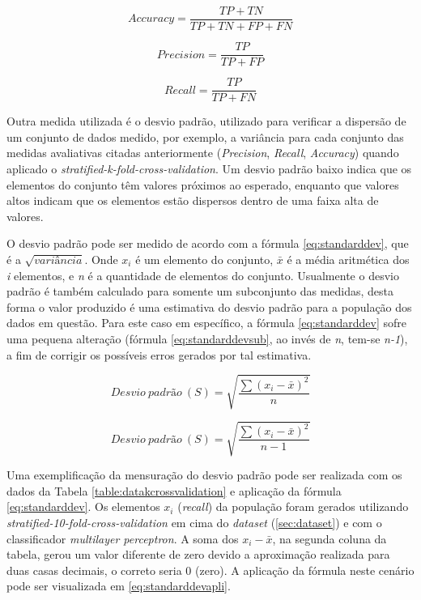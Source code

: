 \begin{equation} 
  Accuracy = \frac{TP+TN}{TP+TN+FP+FN} 
  \label{eq:accuracy}
\end{equation}

\begin{equation} 
  Precision = \frac{TP}{TP+FP}
  \label{eq:precision}
\end{equation}

\begin{equation} 
  Recall = \frac{TP}{TP+FN} 
  \label{eq:recall}
\end{equation}

Outra medida utilizada é o desvio padrão, utilizado para verificar a dispersão de um conjunto de dados medido, por exemplo, a variância para cada conjunto das medidas avaliativas citadas anteriormente (\textit{Precision}, \textit{Recall}, \textit{Accuracy}) quando aplicado o \textit{stratified-k-fold-cross-validation}. Um desvio padrão baixo indica que os elementos do conjunto têm valores próximos ao esperado, enquanto que valores altos indicam que os elementos estão dispersos dentro de uma faixa alta de valores.\cite{Kerr:2002}\cite{Bland:1996}

O desvio padrão pode ser medido de acordo com a fórmula \ref{eq:standarddev}, que é a $\sqrt{variância}$. Onde $x_{i}$ é um elemento do conjunto, $\bar{x}$ é a média aritmética dos \textit{i} elementos, e \textit{n} é a quantidade de elementos do conjunto. Usualmente o desvio padrão é também calculado para somente um subconjunto das medidas, desta forma o valor produzido é uma estimativa do desvio padrão para a população dos dados em questão. Para este caso em específico, a fórmula \ref{eq:standarddev} sofre uma pequena alteração (fórmula \ref{eq:standarddevsub}, ao  invés de \textit{n}, tem-se \textit{n-1}), a fim de corrigir os possíveis erros gerados por tal estimativa.\cite{Kerr:2002}

\begin{equation} 
  Desvio~padrão~(S) = \sqrt{\frac{\sum{(x_{i}-\bar{x})^2}}{n}} 
  \label{eq:standarddev}
\end{equation}

\begin{equation} 
  Desvio~padrão~(S) = \sqrt{\frac{\sum{(x_{i}-\bar{x})^2}}{n-1}} 
  \label{eq:standarddevsub}
\end{equation}

Uma exemplificação da mensuração do desvio padrão pode ser realizada com os dados da Tabela \ref{table:datakcrossvalidation} e aplicação da fórmula \ref{eq:standarddev}. Os elementos \textit{$x_{i}$} (\textit{recall}) da população foram gerados utilizando \textit{stratified-10-fold-cross-validation} em cima do \textit{dataset} (\ref{sec:dataset}) e com o classificador \textit{multilayer perceptron}. A soma dos \textit{$x_{i}-\bar{x}$}, na segunda coluna da tabela, gerou um valor diferente de zero devido a aproximação realizada para duas casas decimais, o correto seria 0 (zero). A aplicação da fórmula neste cenário pode ser visualizada em \ref{eq:standarddevapli}.

